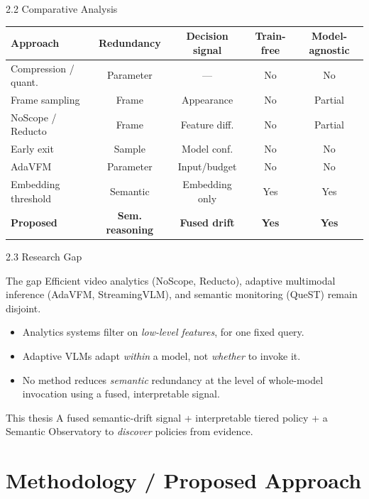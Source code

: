 \documentclass[11pt,aspectratio=169]{beamer}
\begin{document}
\begin{frame}{2.2 Comparative Analysis}
\centering
\small
\begin{tabular}{@{}lcccc@{}}
\toprule
\textbf{Approach} & \textbf{Redundancy} & \textbf{Decision signal} & \textbf{Train-free} & \textbf{Model-agnostic}\\
\midrule
Compression / quant. & Parameter & --- & No & No\\
Frame sampling       & Frame & Appearance & No & Partial\\
NoScope / Reducto    & Frame & Feature diff. & No & Partial\\
Early exit           & Sample & Model conf. & No & No\\
AdaVFM               & Parameter & Input/budget & No & No\\
Embedding threshold  & Semantic & Embedding only & Yes & Yes\\
\alert{\textbf{Proposed}} & \alert{\textbf{Sem. reasoning}} & \alert{\textbf{Fused drift}} & \alert{\textbf{Yes}} & \alert{\textbf{Yes}}\\
\bottomrule
\end{tabular}
\end{frame}

\begin{frame}{2.3 Research Gap}
\begin{block}{The gap}
Efficient video analytics (NoScope, Reducto), adaptive multimodal inference (AdaVFM, StreamingVLM), and semantic monitoring (QueST) remain \alert{disjoint}.
\end{block}
\begin{itemize}
  \item Analytics systems filter on \emph{low-level features}, for one fixed query.
  \item Adaptive VLMs adapt \emph{within} a model, not \emph{whether} to invoke it.
  \item No method reduces \emph{semantic} redundancy at the level of whole-model invocation using a fused, interpretable signal.
\end{itemize}
\begin{block}{This thesis}
A fused semantic-drift signal + interpretable tiered policy + a Semantic Observatory to \emph{discover} policies from evidence.
\end{block}
\end{frame}

\section{Methodology / Proposed Approach}
\end{document}
